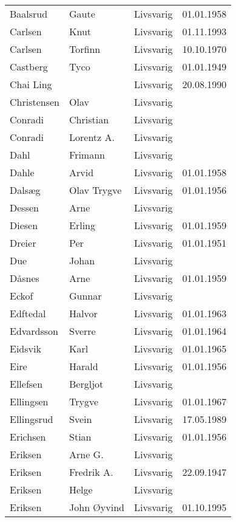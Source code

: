\begin{longtable}{llll}
        Baalsrud	&	Gaute	&	Livsvarig 	&	01.01.1958	\\
        Carlsen	&	Knut	&	Livsvarig 	&	01.11.1993	\\
        Carlsen	&	Torfinn	&	Livsvarig 	&	10.10.1970	\\
        Castberg	&	Tyco	&	Livsvarig 	&	01.01.1949	\\
        Chai Ling	&		&	Livsvarig 	&	20.08.1990	\\
        Christensen	&	Olav	&	Livsvarig 	&		\\
        Conradi	&	Christian	&	Livsvarig 	&		\\
        Conradi	&	Lorentz A.	&	Livsvarig 	&		\\
        Dahl	&	Frimann	&	Livsvarig 	&		\\
        Dahle	&	Arvid	&	Livsvarig 	&	01.01.1958	\\
        Dalsæg	&	Olav Trygve	&	Livsvarig 	&	01.01.1956	\\
        Dessen	&	Arne	&	Livsvarig 	&		\\
        Diesen	&	Erling	&	Livsvarig 	&	01.01.1959	\\
        Dreier	&	Per	&	Livsvarig 	&	01.01.1951	\\
        Due	&	Johan	&	Livsvarig 	&		\\
        Dåsnes	&	Arne	&	Livsvarig 	&	01.01.1959	\\
        Eckof	&	Gunnar	&	Livsvarig 	&		\\
        Edftedal	&	Halvor	&	Livsvarig 	&	01.01.1963	\\
        Edvardsson	&	Sverre	&	Livsvarig 	&	01.01.1964	\\
        Eidsvik	&	Karl	&	Livsvarig 	&	01.01.1965	\\
        Eire	&	Harald	&	Livsvarig 	&	01.01.1956	\\
        Ellefsen	&	Bergljot	&	Livsvarig 	&		\\
        Ellingsen	&	Trygve	&	Livsvarig 	&	01.01.1967	\\
        Ellingsrud	&	Svein	&	Livsvarig 	&	17.05.1989	\\
        Erichsen	&	Stian	&	Livsvarig 	&	01.01.1956	\\
        Eriksen	&	Arne G.	&	Livsvarig 	&		\\
        Eriksen	&	Fredrik A.	&	Livsvarig 	&	22.09.1947	\\
        Eriksen	&	Helge	&	Livsvarig 	&		\\
        Eriksen 	&	John Øyvind	&	Livsvarig	&	01.10.1995	\\

\end{longtable}
